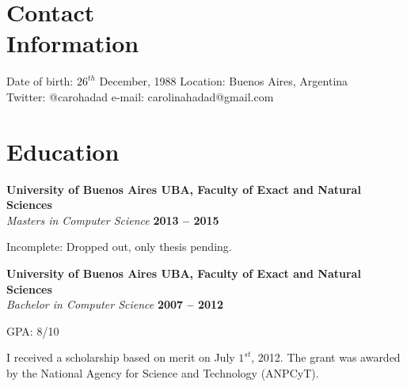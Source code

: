 \documentclass[margin,line]{resume}
\begin{document}
\begin{resume}

\section{\mysidestyle Contact\\Information}

Date of birth: $26^{th}$ December, 1988  \hfill Location: Buenos Aires, Argentina\\ \vspace{0.5mm}
\hspace{-2.2mm} Twitter: @carohadad \hfill e-mail: carolinahadad@gmail.com\\ \vspace{0.5mm}

\section{\mysidestyle Education}

\textbf{University of Buenos Aires UBA, Faculty of Exact and Natural Sciences} \vspace{2mm}\\\vspace{1mm}
\textsl{Masters in Computer Science} \hfill \textbf{2013 -- 2015}\vspace{-3mm}\\\vspace{-1mm}
\begin{list2}
	\item Incomplete: Dropped out, only thesis pending.
\end{list2}

\textbf{University of Buenos Aires UBA, Faculty of Exact and Natural Sciences} \vspace{2mm}\\\vspace{1mm}
\textsl{Bachelor in Computer Science} \hfill \textbf{2007 -- 2012}\vspace{-3mm}\\\vspace{-1mm}
\begin{list2}
	\item GPA: 8/10
	\item I received a scholarship based on merit on July $1^{st}$, 2012. The grant was awarded by the National Agency for Science and Technology (ANPCyT).
\end{list2}
    

\end{resume}
\end{document}
